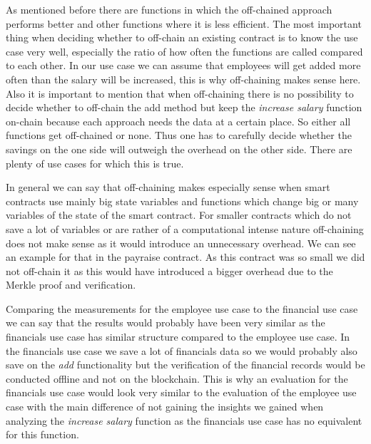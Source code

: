 As mentioned before there are functions in which the off-chained approach performs better and other functions where it is less efficient.
The most important thing when deciding whether to off-chain an existing contract is to know the use case very well, especially the ratio of how often the functions are called compared to each other.
In our use case we can assume that employees will get added more often than the salary will be increased, this is why off-chaining makes sense here.
Also it is important to mention that when off-chaining there is no possibility to decide whether to off-chain the add method but keep the \textit{increase salary} function on-chain because each approach needs the data at a certain place.
So either all functions get off-chained or none.
Thus one has to carefully decide whether the savings on the one side will outweigh the overhead on the other side.
There are plenty of use cases for which this is true.

In general we can say that off-chaining makes especially sense when smart contracts use mainly big state variables and functions which change big or many variables of the state of the smart contract.
For smaller contracts which do not save a lot of variables or are rather of a computational intense nature off-chaining does not make sense as it would introduce an unnecessary overhead.
We can see an example for that in the payraise contract.
As this contract was so small we did not off-chain it as this would have introduced a bigger overhead due to the Merkle proof and verification.

Comparing the measurements for the employee use case to the financial use case we can say that the results would probably have been very similar as the financials use case has similar structure compared to the employee use case.
In the financials use case we save a lot of financials data so we would probably also save on the \textit{add} functionality but the verification of the financial records would be conducted offline and not on the blockchain.
This is why an evaluation for the financials use case would look very similar to the evaluation of the employee use case with the main difference of not gaining the insights we gained when analyzing the \textit{increase salary} function as the financials use case has no equivalent for this function.

